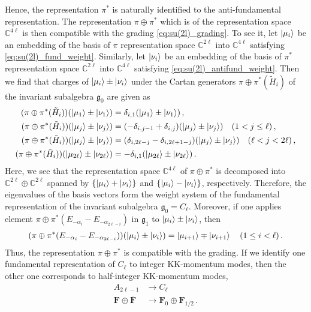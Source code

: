 Hence, the representation $ \pi^* $ is naturally identified to the anti-fundamental representation. The representation $ \pi \oplus \pi^* $ which is of the representation space $ \mathbb{C}^{4\ell} $ is then compatible with the grading \eqref{eq:su(2l)_grading}. To see it, let $ \ket{\mu_i} $ be an embedding of the basis of $ \pi $ representation space $ \mathbb{C}^{2\ell} $ into $ \mathbb{C}^{4\ell} $ satisfying \eqref{eq:su(2l)_fund_weight}. Similarly, let $ \ket{\nu_i} $ be an embedding of the basis of $ \pi^* $ representation space $ \mathbb{C}^{2\ell} $ into $ \mathbb{C}^{4\ell} $ satisfying \eqref{eq:su(2l)_antifund_weight}. Then we find that charges of $ \ket{\mu_i} \pm \ket{\nu_i} $ under the Cartan generators $ \pi \oplus \pi^*(\tilde{H}_i) $ of the invariant subalgebra $ \mathfrak{g}_0 $ are given as
\begin{align}
(\pi \oplus \pi^*(\tilde{H}_i)) (\ket{\mu_1} \pm \ket{\nu_1}) &= \delta_{i,1} (\ket{\mu_1} \pm \ket{\nu_1}) \, , \nonumber \\
(\pi \oplus \pi^*(\tilde{H}_i)) (\ket{\mu_j} \pm \ket{\nu_j}) &= (-\delta_{i,j-1} + \delta_{i,j}) (\ket{\mu_j} \pm \ket{\nu_j}) \quad (1 < j \leq \ell) \, , \nonumber \\
(\pi \oplus \pi^*(\tilde{H}_i)) (\ket{\mu_j} \pm \ket{\nu_j}) &= (\delta_{i,2\ell-j} - \delta_{i,2\ell+1-j}) (\ket{\mu_j} \pm \ket{\nu_j}) \quad (\ell < j < 2\ell) \, , \nonumber \\
(\pi \oplus \pi^*(\tilde{H}_i)) (\ket{\mu_{2\ell}} \pm \ket{\nu_{2\ell}}) &= -\delta_{i,1} (\ket{\mu_{2\ell}} \pm \ket{\nu_{2\ell}}) \, . 
\end{align}
Here, we see that the representation space $ \mathbb{C}^{4\ell} $ of $ \pi \oplus \pi^* $ is decomposed into $ \mathbb{C}^{2\ell} \oplus \mathbb{C}^{2\ell} $ spanned by $ \{\ket{\mu_i} + \ket{\nu_i} \} $ and $ \{\ket{\mu_i} - \ket{\nu_i} \} $, respectively. 
Therefore, the eigenvalues of the basis vectors form the weight system of the fundamental representation of the invariant subalgebra $ \mathfrak{g}_0 = C_\ell $. Moreover, if one applies element $ \pi \oplus \pi^*(E_{-\alpha_i} - E_{-\alpha_{2\ell-i}}) $ in $ \mathfrak{g}_1 $ to $ \ket{\mu_i} \pm \ket{\nu_i} $, then
\begin{align}
(\pi \oplus \pi^*(E_{-\alpha_i} - E_{-\alpha_{2\ell-i}}))(\ket{\mu_i} \pm \ket{\nu_i}) = \ket{\mu_{i+1}} \mp \ket{\nu_{i+1}} \quad (1 \leq i < \ell) \, .
\end{align}
Thus, the representation $ \pi \oplus \pi^* $ is compatible with the grading. If we identify one fundamental representation of $ C_\ell $ to integer KK-momentum modes, then the other one corresponds to half-integer KK-momentum modes,
\begin{align}
A_{2\ell-1} &\to C_\ell \nonumber \\
\mathbf{F} \oplus \overline{\mathbf{F}} &\to \mathbf{F}_0 \oplus \mathbf{F}_{1/2} \, .
\end{align}

